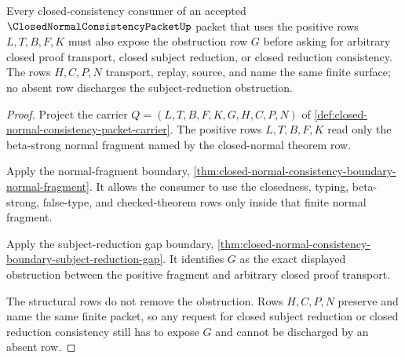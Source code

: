 \begin{theorem}
\label{thm:closed-normal-consistency-subject-reduction-obstruction-readback}
Every closed-consistency consumer of an accepted $\ClosedNormalConsistencyPacketUp$ packet that uses the positive rows $L,T,B,F,K$ must also expose the obstruction row $G$ before asking for arbitrary closed proof transport, closed subject reduction, or closed reduction consistency. The rows $H,C,P,N$ transport, replay, source, and name the same finite surface; no absent row discharges the subject-reduction obstruction.
\end{theorem}
\begin{proof}
Project the carrier $Q=(L,T,B,F,K,G,H,C,P,N)$ of \autoref{def:closed-normal-consistency-packet-carrier}. The positive rows $L,T,B,F,K$ read only the beta-strong normal fragment named by the closed-normal theorem row.

Apply the normal-fragment boundary, \autoref{thm:closed-normal-consistency-boundary-normal-fragment}. It allows the consumer to use the closedness, typing, beta-strong, false-type, and checked-theorem rows only inside that finite normal fragment.

Apply the subject-reduction gap boundary, \autoref{thm:closed-normal-consistency-boundary-subject-reduction-gap}. It identifies $G$ as the exact displayed obstruction between the positive fragment and arbitrary closed proof transport.

The structural rows do not remove the obstruction. Rows $H,C,P,N$ preserve and name the same finite packet, so any request for closed subject reduction or closed reduction consistency still has to expose $G$ and cannot be discharged by an absent row.
\end{proof}

